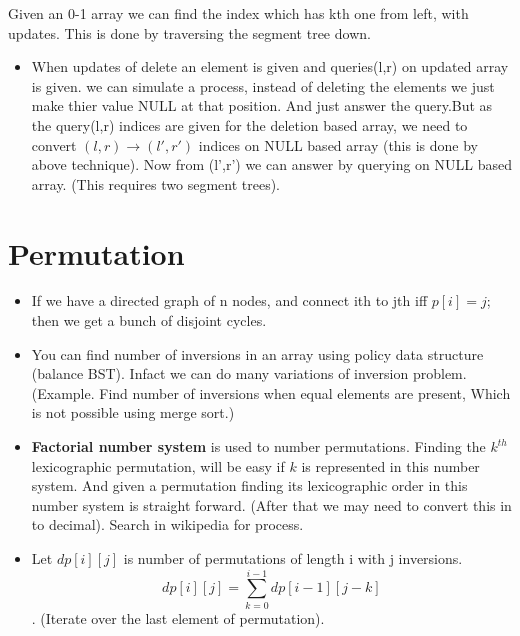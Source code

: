 \documentclass[../Notes.tex]{subfiles}
\begin{document}
Given an 0-1 array we can find the index which has kth one from left, with updates. This is done by traversing the segment tree down.\\
\begin{itemize}

\item When updates of delete an element is given and queries(l,r) on updated array is given. we can simulate a process, instead of deleting the elements we just make thier value NULL at that position. And just answer the query.But as the query(l,r) indices are given for the deletion based array, we need to convert $(l,r)\rightarrow (l',r')$ indices on NULL based array (this is done by above technique). Now from (l',r') we can answer by querying on NULL based array. (This requires two segment trees).
\end{itemize}

\section{Permutation}
\begin{itemize}
	\item If we have a directed graph of n nodes, and connect ith to jth iff $p[i]=j$; then we get a bunch of disjoint cycles.
	\item You can find number of inversions in an array using policy data structure (balance BST). Infact we can do many variations of inversion problem. (Example. Find number of inversions when equal elements are present, Which is not possible using merge sort.)
	\item \textbf{Factorial number system} is used to number permutations. Finding the $k^{th}$ lexicographic permutation, will be easy if $k$ is represented in this number system. And given a permutation finding its lexicographic order in this number system is straight forward. (After that we may need to convert this in to decimal). Search in wikipedia for process.
	\item Let $dp[i][j]$ is number of permutations of length i with j inversions. $$dp[i][j] = \sum_{k=0}^{i-1}dp[i-1][j-k]$$. (Iterate over the last element of permutation).
\end{itemize}
\end{document}
